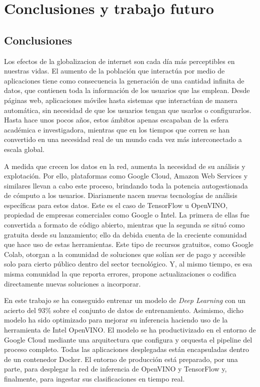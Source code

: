 \mbox{}

\chapter{Conclusiones y trabajo futuro}
\label{ch:chapte6}

\section{Conclusiones}\label{sec:conclusiones}
Los efectos de la globalizacion de internet son cada día más perceptibles en nuestras vidas.
El aumento de la población que interactúa por medio de aplicaciones tiene como consecuencia la generación de una cantidad infinita de datos, que contienen toda la información de los usuarios que las emplean. Desde páginas web, aplicaciones móviles hasta sistemas que interactúan de manera automática, sin necesidad de que los usuarios tengan que usarlos o configurarlos. Hasta hace unos pocos años, estos ámbitos apenas escapaban de la esfera académica e investigadora, mientras que en los tiempos que corren se han convertido en una necesidad real de un mundo cada vez más interconectado a escala global.


A medida que crecen los datos en la red, aumenta la necesidad de su análisis y explotación.
Por ello, plataformas como Google Cloud, Amazon Web Services y similares llevan a cabo este proceso, brindando toda la potencia autogestionada de cómputo a los usuarios.
Diariamente nacen nuevas tecnologías de análisis específicas para estos datos.
Este es el caso de TensorFlow u OpenVINO, propiedad de empresas comerciales como Google o Intel.
La primera de ellas fue convertida a formato de código abierto, mientras que la segunda se situó como gratuita desde su lanzamiento; ello da debida cuenta de la creciente comunidad que hace uso de estas herramientas.
Este tipo de recursos gratuitos, como Google Colab, otorgan a la comunidad de soluciones que solían ser de pago y accesible solo para cierto público dentro del sector tecnológico.
Y, al mismo tiempo, es esa misma comunidad la que reporta errores, propone actualizaciones o codifica directamente nuevas soluciones a incorporar.

En este trabajo se ha conseguido entrenar un modelo de \textit{Deep Learning} con un acierto del 93\% sobre el conjunto de datos de entrenamiento.
Asimismo, dicho modelo ha sido optimizado para mejorar su inferencia haciendo uso de la herramienta de Intel OpenVINO\@.
El modelo se ha productivizado en el entorno de Google Cloud mediante una arquitectura que configura y orquesta el pipeline del proceso completo. Todas las aplicaciones desplegadas están encapsuladas dentro de un contenedor Docker.
El entorno de producción está preparado, por una parte, para desplegar la red de inferencia de OpenVINO y TensorFlow y, finalmente, para ingestar sus clasificaciones en tiempo real.

